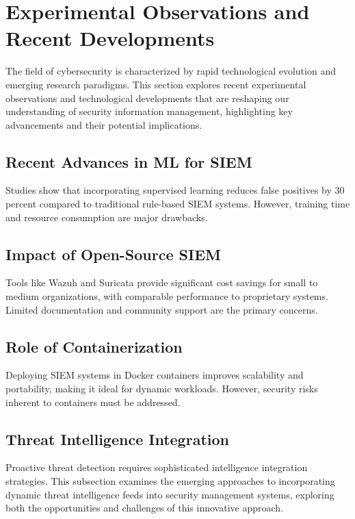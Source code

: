 \section{Experimental Observations and Recent Developments}
\label{sec_experimental_observations}

The field of cybersecurity is characterized by rapid technological evolution and emerging research paradigms. This section explores recent experimental observations and technological developments that are reshaping our understanding of security information management, highlighting key advancements and their potential implications.

\subsection{Recent Advances in ML for SIEM}
\label{subsec_recent_advances_ml_siem}

Studies show that incorporating supervised learning reduces false positives by 30 percent compared to traditional rule-based SIEM systems. However, training time and resource consumption are major drawbacks.

\subsection{Impact of Open-Source SIEM}
\label{subsec_impact_open_source_siem}

Tools like Wazuh and Suricata provide significant cost savings for small to medium organizations, with comparable performance to proprietary systems. Limited documentation and community support are the primary concerns.

\subsection{Role of Containerization}
\label{subsec_role_of_containerization}

Deploying SIEM systems in Docker containers improves scalability and portability, making it ideal for dynamic workloads. However, security risks inherent to containers must be addressed.

\subsection{Threat Intelligence Integration}
\label{subsec_threat_intelligence_integration}

Proactive threat detection requires sophisticated intelligence integration strategies. This subsection examines the emerging approaches to incorporating dynamic threat intelligence feeds into security management systems, exploring both the opportunities and challenges of this innovative approach.
